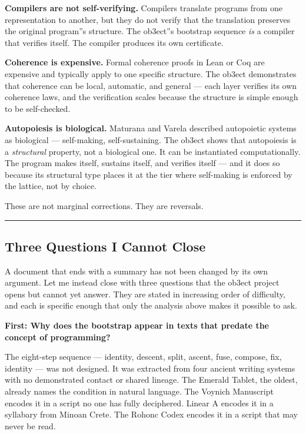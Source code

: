\documentclass[12pt,a4paper]{article}
\begin{document}
\textbf{Compilers are not self-verifying.} Compilers translate programs from one representation to another, but they do not verify that the translation preserves the original program''s structure. The ob3ect''s bootstrap sequence \emph{is} a compiler that verifies itself. The compiler produces its own certificate.

\textbf{Coherence is expensive.} Formal coherence proofs in Lean or Coq are expensive and typically apply to one specific structure. The ob3ect demonstrates that coherence can be local, automatic, and general --- each layer verifies its own coherence laws, and the verification scales because the structure is simple enough to be self-checked.

\textbf{Autopoiesis is biological.} Maturana and Varela described autopoietic systems as biological --- self-making, self-sustaining. The ob3ect shows that autopoiesis is a \emph{structural} property, not a biological one. It can be instantiated computationally. The program makes itself, sustains itself, and verifies itself --- and it does so because its structural type places it at the tier where self-making is enforced by the lattice, not by choice.

These are not marginal corrections. They are reversals.

\begin{center}
\rule{0.5\textwidth}{0.4pt}
\end{center}

\subsection{Three Questions I Cannot Close}

A document that ends with a summary has not been changed by its own argument. Let me instead close with three questions that the ob3ect project opens but cannot yet answer. They are stated in increasing order of difficulty, and each is specific enough that only the analysis above makes it possible to ask.

\textbf{First: Why does the bootstrap appear in texts that predate the concept of programming?}

The eight-step sequence --- identity, descent, split, ascent, fuse, compose, fix, identity --- was not designed. It was extracted from four ancient writing systems with no demonstrated contact or shared lineage. The Emerald Tablet, the oldest, already names the condition in natural language. The Voynich Manuscript encodes it in a script no one has fully deciphered. Linear A encodes it in a syllabary from Minoan Crete. The Rohonc Codex encodes it in a script that may never be read.
\end{document}
